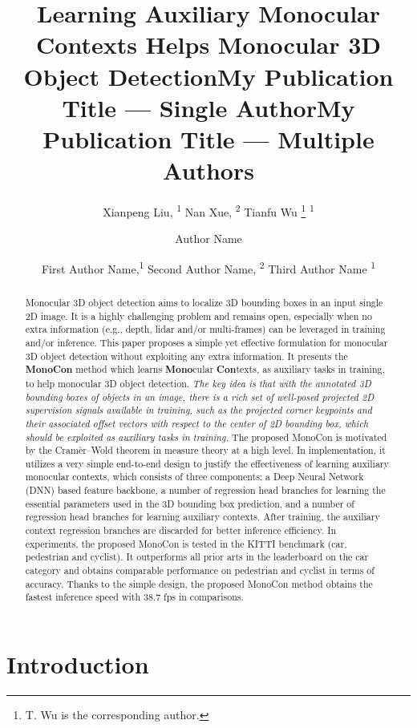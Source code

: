 \documentclass[letterpaper]{article} \usepackage{aaai22}  \usepackage{times}  \usepackage{helvet}  \usepackage{courier}  \usepackage[hyphens]{url}  \usepackage{graphicx} \urlstyle{rm} \def\UrlFont{\rm}  \usepackage{natbib}  \usepackage{caption} \DeclareCaptionStyle{ruled}{labelfont=normalfont,labelsep=colon,strut=off} \frenchspacing  \setlength{\pdfpagewidth}{8.5in}  \setlength{\pdfpageheight}{11in}  \usepackage{algorithm}
\title{Learning Auxiliary Monocular Contexts Helps Monocular 3D Object Detection}
\author{
Xianpeng Liu, \textsuperscript{\rm 1}
    Nan Xue, \textsuperscript{\rm 2} 
    Tianfu Wu \thanks{T. Wu is the corresponding author.} \textsuperscript{\rm 1}
}
\title{My Publication Title --- Single Author}
\author {
    Author Name
}
\title{My Publication Title --- Multiple Authors}
\author {
First Author Name,\textsuperscript{\rm 1}
    Second Author Name, \textsuperscript{\rm 2}
    Third Author Name \textsuperscript{\rm 1}
}
\begin{document}
\maketitle

\begin{abstract}
Monocular 3D object detection aims to localize 3D bounding boxes in an input single 2D image. It is a highly challenging problem and remains open, especially when no extra information (e.g., depth, lidar and/or multi-frames) can be leveraged in training and/or inference.   
This paper proposes a simple yet effective formulation for monocular 3D object detection without exploiting any extra information. It presents the \textbf{MonoCon} method which learns \textbf{Mono}cular \textbf{Con}texts, as auxiliary tasks in training, to help monocular 3D object detection. 
\textit{The key idea is that with the annotated 3D bounding boxes of objects in an image, there is a rich set of well-posed projected 2D supervision signals available in training, such as the projected corner keypoints and their associated offset vectors with respect to the center of 2D bounding box, which should be exploited as auxiliary tasks in training.}
The proposed MonoCon is motivated by the Cram\`er–Wold theorem in measure theory at a high level.  
In implementation, it utilizes a very simple end-to-end design to justify the effectiveness of learning auxiliary monocular contexts, which  consists of three components: a Deep Neural Network (DNN) based feature backbone, a number of regression head branches for learning the essential parameters used in the 3D bounding box prediction, and a number of regression head branches for learning auxiliary contexts. After training, the auxiliary context regression branches are discarded for better inference efficiency. In experiments, the proposed MonoCon is tested in the KITTI benchmark (car, pedestrian and cyclist). It outperforms all prior arts in the leaderboard on the car category and obtains comparable performance on pedestrian and cyclist in terms of accuracy. Thanks to the simple design, the proposed MonoCon method obtains the fastest inference speed with 38.7 fps in comparisons.
\end{abstract}

\setlength{\abovecaptionskip}{1pt}
\setlength{\belowcaptionskip}{-6pt}
\setlength{\belowdisplayskip}{1pt} \setlength{\belowdisplayshortskip}{1pt}
\setlength{\abovedisplayskip}{1pt} \setlength{\abovedisplayshortskip}{1pt} 

\section{Introduction}
\end{document}
